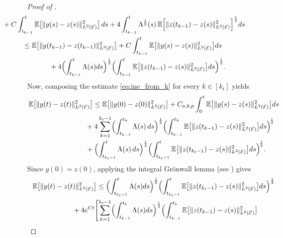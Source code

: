 \documentclass[a4paper, 10pt, english]{article}
\begin{document}
\begin{proof}[Proof of  ]
\begin{align}
\nonumber
&\hspace{-3cm}+
C \int_{t_{k-1}}^{t}
\mathbb{E}\bigl[\|y(s) - z(s)\|_{L^2(\mathcal{E})}^2\bigr]\,
ds
+ 4 \int_{t_{k-1}}^{t}
\Lambda^{\frac{1}{2}}(s)\,\mathbb{E}\Bigl[\|z(t_{k-1}) - z(s)\|_{L^2(\mathcal{E})}^2\Bigr]^{\frac{1}{2}}ds
\\
\nonumber&\hspace{-2cm}\le
\mathbb{E}\bigl[\|y(t_{k-1}) - z(t_{k-1})\|_{L^2(\mathcal{E})}^2\bigr]
+
C \int_{t_{k-1}}^{t}
\mathbb{E}\bigl[\|y(s) - z(s)\|_{L^2(\mathcal{E})}^2\bigr]
ds
\\
&\hspace{-1.0cm}\quad
+ 4 \Bigl(\int_{t_{k-1}}^{t}\Lambda(s)ds\Bigr)^{\frac{1}{2}}
\Bigl(\int_{t_{k-1}}^{t}
\mathbb{E}\bigl[\|z(t_{k-1}) - z(s)\|_{L^2(\mathcal{E})}^2\bigr]ds\Bigr)^{\frac{1}{2}}.
\end{align}
Now, composing the estimate \eqref{eq:ine_from_k} for every $k\in [k_t]$ yields
\begin{align*}
&\mathbb{E}\bigl[\|y(t) - z(t)\|_{L^2(\mathcal{E})}^2\bigr]
\le
\mathbb{E}\bigl[\|y(0) - z(0)\|_{L^2(\mathcal{E})}^2\bigr]
+
C_{a,b,p} \int_{0}^{t}
\mathbb{E}\bigl[\|y(s) - z(s)\|_{L^2(\mathcal{E})}^2\bigr]
ds
\\
&\hspace{2.5cm}\quad
+4 \sum_{k=1}^{k_t - 1}
\Bigl(\int_{t_{k-1}}^{t_{k}}\Lambda(s)\,ds\Bigr)^{\frac{1}{2}}
\Bigl(\int_{t_{k-1}}^{t_{k}}
\mathbb{E}\bigl[\|z(t_{k-1}) - z(s)\|_{L^2(\mathcal{E})}^2\bigr]
ds\Bigr)^{\!\frac{1}{2}}
\\
&\hspace{2.5cm}\quad
+
\Bigl(\int_{t_{k_t - 1}}^{t}\Lambda(s)\,ds\Bigr)^{\frac{1}{2}}
\Bigl(\int_{t_{k_t - 1}}^{t}
\mathbb{E}\bigl[\|z(t_{k_t - 1}) - z(s)\|_{L^2(\mathcal{E})}^2\bigr]
ds\Bigr)^{\!\frac{1}{2}}.
\end{align*}
Since $y(0) = z(0)$, applying the integral Gr\"onwall lemma (see \cite[Appendix B.k]{evans_book}) gives
\begin{align*}
&\mathbb{E}\bigl[\|y(t) - z(t)\|_{L^2(\mathcal{E})}^2\bigr]\le \Bigl(\int_{t_{k_t - 1}}^{t}\Lambda(s)ds\Bigr)^{\frac{1}{2}}
   \Bigl(\int_{t_{k_t - 1}}^{t}
     \mathbb{E}\bigl[\|z(t_{k_t - 1}) - z(s)\|_{L^2(\mathcal{E})}^2\bigr]
     ds\Bigr)^{\frac{1}{2}}\\
     &\hspace{2cm}+
4e^{Ct}\Biggl[
  \sum_{k=1}^{k_t - 1}
    \Bigl(\int_{t_{k-1}}^{t_{k}}\Lambda(s)ds\Bigr)^{\frac{1}{2}}
    \Bigl(\int_{t_{k-1}}^{t_{k}}
      \mathbb{E}\bigl[\|z(t_{k-1}) - z(s)\|_{L^2(\mathcal{E})}^2\bigr]

\end{align*}
\end{proof}
\end{document}
